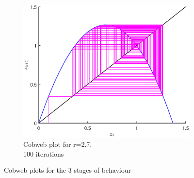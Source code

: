 \documentclass[a4paper]{article}
\begin{document}
\begin{figure}
\begin{subfigure}[b]{0.3\textwidth}
    \end{subfigure}
    ~ %
    \begin{subfigure}[b]{0.3\textwidth}
        \includegraphics[width=\textwidth]{cobweb3}
        \caption{Cobweb plot for r=2.7, \\100 iterations}
    \end{subfigure}
    \caption{Cobweb plots for the 3 stages of behaviour}\label{fig:animals}
\end{figure} 
\end{document}

